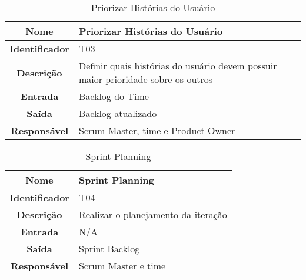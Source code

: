{             \begin{table}[H]
                \centering
                \caption{Priorizar Histórias do Usuário}
                \begin{tabular}{c|p{10cm}}
                    \hline
                    \textbf{Nome}            & Priorizar Histórias do Usuário\\
                    \hline
                    \textbf{Identificador} & T03\\
                    \hline
                    \textbf{Descrição}   & Definir quais histórias do usuário devem possuir maior prioridade sobre os outros\\
                    \hline
                    \textbf{Entrada}           & Backlog do Time\\
                    \hline
                    \textbf{Saída}            &  Backlog atualizado\\
                    \hline
                    \textbf{Responsável}            &  Scrum Master, time e Product Owner\\
                    \hline
                \end{tabular}
            \end{table}

             \begin{table}[H]
                \centering
                \caption{Sprint Planning }
                \begin{tabular}{c|p{10cm}}
                    \hline
                    \textbf{Nome}            & Sprint Planning \\
                    \hline
                    \textbf{Identificador} & T04\\
                    \hline
                    \textbf{Descrição}   & Realizar o planejamento da iteração\\
                    \hline
                    \textbf{Entrada}           & N/A\\
                    \hline
                    \textbf{Saída}            & Sprint Backlog\\
                    \hline
                    \textbf{Responsável}            & Scrum Master e  time \\
                    \hline
                \end{tabular}
            \end{table}

}
